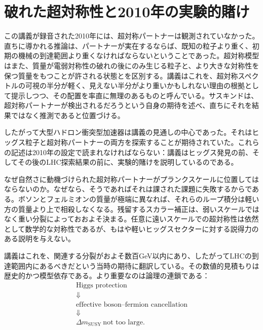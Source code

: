 \section{破れた超対称性と2010年の実験的賭け}

この講義が録音された2010年には、超対称パートナーは観測されていなかった。直ちに導かれる推論は、パートナーが実在するならば、既知の粒子より重く、初期の機械の到達範囲より重くなければならないということであった。超対称模型はまた、質量が電弱対称性の破れの後にのみ生じる粒子と、より大きな対称性を保つ質量をもつことが許される状態とを区別する。講義はこれを、超対称スペクトルの可視の半分が軽く、見えない半分がより重いかもしれない理由の根拠として提示しつつ、その配置を率直に無理のあるものと呼んでいる。サスキンドは、超対称パートナーが検出されるだろうという自身の期待を述べ、直ちにそれを結果ではなく推測であると位置づける。

したがって大型ハドロン衝突型加速器は講義の見通しの中心であった。それはヒッグス粒子と超対称パートナーの両方を探索することが期待されていた。これらの記述は2010年の設定で読まれなければならない：講義はヒッグス発見の前、そしてその後のLHC探索結果の前に、実験的賭けを説明しているのである。

なぜ自然さに動機づけられた超対称パートナーがプランクスケールに位置してはならないのか。なぜなら、そうであればそれは課された課題に失敗するからである。ボソンとフェルミオンの質量が極端に異なれば、それらのループ積分は軽い方の質量より上で相殺しなくなる。残留するスカラー補正は、弱いスケールではなく重い分裂によっておおよそ決まる。任意に遠いスケールでの超対称性は依然として数学的な対称性であるが、もはや軽いヒッグスセクターに対する説得力のある説明を与えない。

講義はこれを、関連する分裂がおよそ数百GeV以内にあり、したがってLHCの到達範囲内にあるべきだという当時の期待に翻訳している。その数値的見積もりは歴史的かつ模型依存である。より重要なのは論理の連鎖である：
\begin{equation}
\begin{gathered}
\text{Higgs protection}\\
\Downarrow\\
\text{effective boson--fermion cancellation}\\
\Downarrow\\
\Delta m_{\mathrm{SUSY}}\ \text{not too large}.
\end{gathered}
\end{equation}

\begin{classroomqa}
\end{classroomqa}

